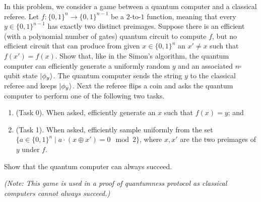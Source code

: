 ﻿\documentclass{homework}
\begin{document}


\begin{problem}
  In this problem, we consider a game between a quantum computer and a classical
  referee.
  Let $f : {\{0,1\}}^n \to {\{0,1\}}^{n-1}$ be a $2$-to-$1$ function, meaning
  that every $y \in {\{0,1\}}^{n-1}$ has exactly two distinct preimages.
  Suppose there is an efficient (with a polynomial number of gates) quantum
  circuit to compute $f$, but no efficient circuit that can produce from given
  $x \in {\{0,1\}}^{n}$ an $x' \ne x$ such that $f(x') = f(x)$.
  Show that, like in the Simon's algorithm, the quantum computer can efficiently
  generate a uniformly random $y$ and an associated $n$-qubit state
  $\lvert\mspace{.5mu}\phi_{y} \mspace{.5mu}\rangle$.
  The quantum computer sends the string $y$ to the classical referee and keeps
  $\lvert\mspace{.5mu}\phi_{y} \mspace{.5mu}\rangle$.
  Next the referee flips a coin and asks the quantum computer to perform one of
  the following two tasks.
  \begin{enumerate}
    \item (Task 0).
          When asked, efficiently generate an $x$ such that $f(x) = y$; and
    \item (Task 1).
          When asked, efficiently sample uniformly from the set
          $\{a \in {\{0,1\}}^{n} \mid a \cdot (x \oplus x') = 0 \mod 2\}$, where
          $x, x'$ are the two preimages of $y$ under $f$.
  \end{enumerate}
  Show that the quantum computer can always succeed.

  \noindent
  \emph{(Note: This game is used in a proof of quantumness protocol as classical
  computers cannot always succeed.)}
\end{problem}

\begin{solution}

\end{solution}
\end{document}
